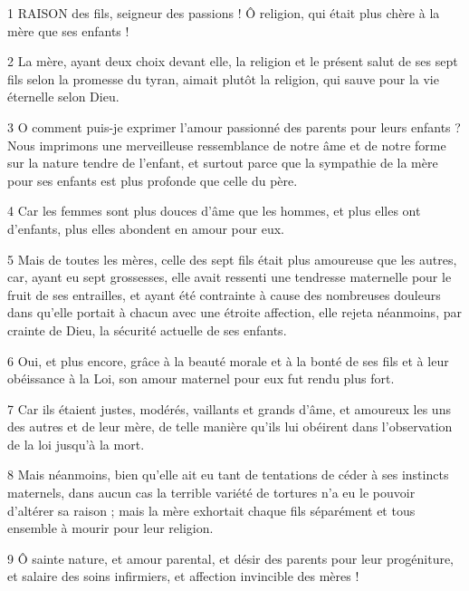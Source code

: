 \par 1 RAISON des fils, seigneur des passions ! Ô religion, qui était plus chère à la mère que ses enfants !

\par 2 La mère, ayant deux choix devant elle, la religion et le présent salut de ses sept fils selon la promesse du tyran, aimait plutôt la religion, qui sauve pour la vie éternelle selon Dieu.

\par 3 O comment puis-je exprimer l'amour passionné des parents pour leurs enfants ? Nous imprimons une merveilleuse ressemblance de notre âme et de notre forme sur la nature tendre de l'enfant, et surtout parce que la sympathie de la mère pour ses enfants est plus profonde que celle du père.

\par 4 Car les femmes sont plus douces d'âme que les hommes, et plus elles ont d'enfants, plus elles abondent en amour pour eux.

\par 5 Mais de toutes les mères, celle des sept fils était plus amoureuse que les autres, car, ayant eu sept grossesses, elle avait ressenti une tendresse maternelle pour le fruit de ses entrailles, et ayant été contrainte à cause des nombreuses douleurs dans qu'elle portait à chacun avec une étroite affection, elle rejeta néanmoins, par crainte de Dieu, la sécurité actuelle de ses enfants.

\par 6 Oui, et plus encore, grâce à la beauté morale et à la bonté de ses fils et à leur obéissance à la Loi, son amour maternel pour eux fut rendu plus fort.

\par 7 Car ils étaient justes, modérés, vaillants et grands d'âme, et amoureux les uns des autres et de leur mère, de telle manière qu'ils lui obéirent dans l'observation de la loi jusqu'à la mort.

\par 8 Mais néanmoins, bien qu'elle ait eu tant de tentations de céder à ses instincts maternels, dans aucun cas la terrible variété de tortures n'a eu le pouvoir d'altérer sa raison ; mais la mère exhortait chaque fils séparément et tous ensemble à mourir pour leur religion.

\par 9 Ô sainte nature, et amour parental, et désir des parents pour leur progéniture, et salaire des soins infirmiers, et affection invincible des mères !

